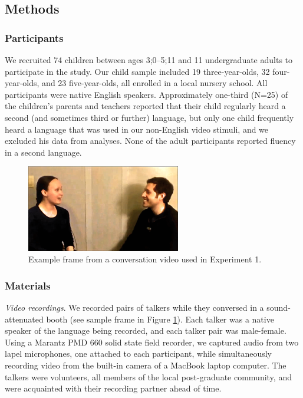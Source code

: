 \documentclass[authoryear, 12pt]{elsarticle}
\begin{document}
\subsection{Methods}
\label{sec:methods1}

\subsubsection{Participants}

We recruited 74 children between ages 3;0--5;11 and 11 undergraduate adults to participate in the study. Our child sample included 19 three-year-olds, 32 four-year-olds, and 23 five-year-olds, all enrolled in a local nursery school. All participants were native English speakers. Approximately one-third (N=25) of the children's parents and teachers reported that their child regularly heard a second (and sometimes third or further) language, but only one child frequently heard a language that was used in our non-English video stimuli, and we excluded his data from analyses. None of the adult participants reported fluency in a second language.

\begin{figure}[t]
\begin{center}
\includegraphics[width=0.6\textwidth]{figures/FIG-FL-stim.png}
\end{center}
\caption{Example frame from a conversation video used in Experiment 1.} 
\label{fig:speakers}
\end{figure}

\subsubsection{Materials}

\textit{Video recordings}. We recorded pairs of talkers while they conversed in a sound-attenuated booth (see sample frame in Figure \ref{fig:speakers}). Each talker was a native speaker of the language being recorded, and each talker pair was male-female. Using a Marantz PMD 660 solid state field recorder, we captured audio from two lapel microphones, one attached to each participant, while simultaneously recording video from the built-in camera of a MacBook laptop computer. The talkers were volunteers, all members of the local post-graduate community, and were acquainted with their recording partner ahead of time. 
\end{document}
